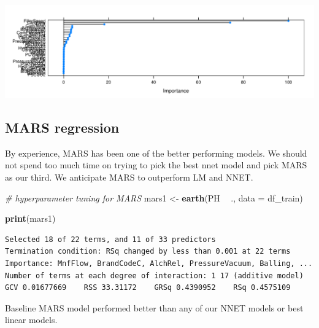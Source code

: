 \documentclass[]{report}
\newenvironment{Shaded}{\begin{snugshade}}{\end{snugshade}}
\newcommand{\CommentTok}[1]{\textcolor[rgb]{0.56,0.35,0.01}{\textit{#1}}}
\newcommand{\DataTypeTok}[1]{\textcolor[rgb]{0.13,0.29,0.53}{#1}}
\newcommand{\KeywordTok}[1]{\textcolor[rgb]{0.13,0.29,0.53}{\textbf{#1}}}
\newcommand{\NormalTok}[1]{#1}
\newcommand{\OperatorTok}[1]{\textcolor[rgb]{0.81,0.36,0.00}{\textbf{#1}}}
\newcommand{\OtherTok}[1]{\textcolor[rgb]{0.56,0.35,0.01}{#1}}
\newcommand{\StringTok}[1]{\textcolor[rgb]{0.31,0.60,0.02}{#1}}
\begin{document}
\includegraphics{Project2-VH_files/figure-latex/project2a14-1.pdf}

\hypertarget{mars-regression}{%
\subsection{MARS regression}\label{mars-regression}}

By experience, MARS has been one of the better performing models. We
should not spend too much time on trying to pick the best nnet model and
pick MARS as our third. We anticipate MARS to outperform LM and NNET.

\begin{Shaded}
\begin{Highlighting}[]
\CommentTok{# hyperparameter tuning for MARS}
\NormalTok{mars1 <-}\StringTok{ }\KeywordTok{earth}\NormalTok{(PH }\OperatorTok{~}\StringTok{ }\NormalTok{., }\DataTypeTok{data =}\NormalTok{ df_train)}

\KeywordTok{print}\NormalTok{(mars1)}
\end{Highlighting}
\end{Shaded}

\begin{verbatim}
Selected 18 of 22 terms, and 11 of 33 predictors
Termination condition: RSq changed by less than 0.001 at 22 terms
Importance: MnfFlow, BrandCodeC, AlchRel, PressureVacuum, Balling, ...
Number of terms at each degree of interaction: 1 17 (additive model)
GCV 0.01677669    RSS 33.31172    GRSq 0.4390952    RSq 0.4575109
\end{verbatim}

Baseline MARS model performed better than any of our NNET models or best
linear models.

\begin{Shaded}
\end{Shaded}
\end{document}
